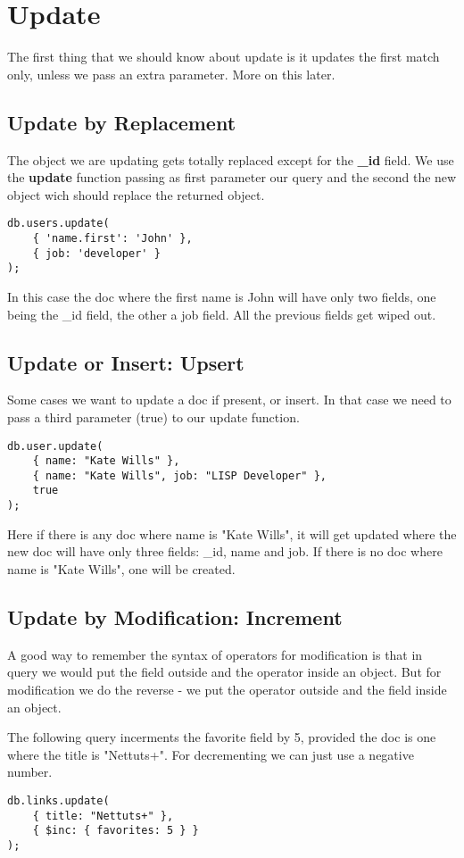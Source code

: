 \documentclass[a4paper, 12pt]{article}
\begin{document}
\section{Update}
The first thing that we should know about update is it updates the first match only, unless we pass an extra parameter. More on this later.
\subsection{Update by Replacement}
The object we are updating gets totally replaced except for the \textbf{\_id} field. We use the \textbf{update} function passing as first parameter our query and the second the new object wich should replace the returned object.
\begin{verbatim}
db.users.update(
    { 'name.first': 'John' }, 
    { job: 'developer' }
);
\end{verbatim}
In this case the doc where the first name is John will have only two fields, one being the \_id field, the other a job field. All the previous fields get wiped out.
\subsection{Update or Insert: Upsert}
Some cases we want to update a doc if present, or insert. In that case we need to pass a third parameter (true) to our update function.
\begin{verbatim}
db.user.update(
    { name: "Kate Wills" },
    { name: "Kate Wills", job: "LISP Developer" }, 
    true
);
\end{verbatim}
Here if there is any doc where name is "Kate Wills", it will get updated where the new doc will have only three fields: \_id, name and job. If there is no doc where name is "Kate Wills", one will be created.
\subsection{Update by Modification: Increment}
A good way to remember the syntax of operators for modification is that in query we would put the field outside and the operator inside an object. But for modification we do the reverse - we put the operator outside and the field inside an object.

The following query incerments the favorite field by 5, provided the doc is one where the title is "Nettuts+". For decrementing we can just use a negative number.
\begin{verbatim}
db.links.update(
    { title: "Nettuts+" },
    { $inc: { favorites: 5 } }
);
\end{verbatim}
\end{document}

